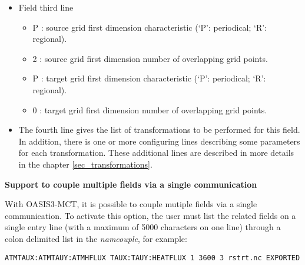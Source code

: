 \begin{itemize}
\begin{itemize}
    These source and target grid dimensions are optional but note that
    in order to have 2D fields written as 2D arrays in the debug
    files, these dimensions must be provided in the {\it namcouple};
    otherwise, the fields will be written out as 1D arrays.
  
  \item toce : prefix of the source grid name in grid data files (see
    section \ref{subsec_griddata}) (80 characters maximum)
  \item atmo : prefix of the target grid name in grid data files (80 characters maximum) 
  \item {\tt LAG=+14400}: optional lag index for the field (see section \ref{subsub_lag})
  \item {\tt SEQ=+1}: optional sequence index for the field (see
    section \ref{subsec_sec})
  \end{itemize}
\item Field third line
  \begin{itemize}
  \item P : source grid first dimension characteristic (`P':
    periodical; `R': regional).
  \item 2 : source grid first dimension number of overlapping grid
    points.
  \item P : target grid first dimension characteristic (`P':
    periodical; `R': regional).
  \item 0 : target grid first dimension number of overlapping grid
    points.
  \end{itemize}
     
\item The fourth line gives the list of transformations to be performed for
this field. In addition, there is one or more configuring lines
describing some parameters for each transformation. These additional
lines are described in more details in the chapter
\ref{sec_transformations}.

\end{itemize}

{\bf Support to couple multiple fields via a single communication}

With OASIS3-MCT, it is possible to couple mutiple fields via a
single communication. To activate this option, the user must list the
related fields on a single entry line (with a maximum of 5000 characters on one line) through a colon
delimited list in the {\it namcouple}, for example:

{\tt ATMTAUX:ATMTAUY:ATMHFLUX  TAUX:TAUY:HEATFLUX 1 3600 3 rstrt.nc EXPORTED}

